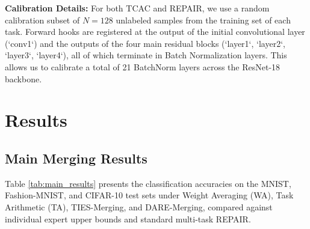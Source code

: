 \documentclass{article}
\theoremstyle{plain}
\theoremstyle{definition}
\theoremstyle{remark}
\begin{document}
\textbf{Calibration Details:} For both TCAC and REPAIR, we use a random calibration subset of $N = 128$ unlabeled samples from the training set of each task. Forward hooks are registered at the output of the initial convolutional layer (`conv1`) and the outputs of the four main residual blocks (`layer1`, `layer2`, `layer3`, `layer4`), all of which terminate in Batch Normalization \cite{ioffe2015batch} layers. This allows us to calibrate a total of 21 BatchNorm layers across the ResNet-18 backbone.

\section{Results}
\label{sec:results}

\subsection{Main Merging Results}
Table \ref{tab:main_results} presents the classification accuracies on the MNIST, Fashion-MNIST, and CIFAR-10 test sets under Weight Averaging (WA), Task Arithmetic (TA), TIES-Merging, and DARE-Merging, compared against individual expert upper bounds and standard multi-task REPAIR.
\end{document}
